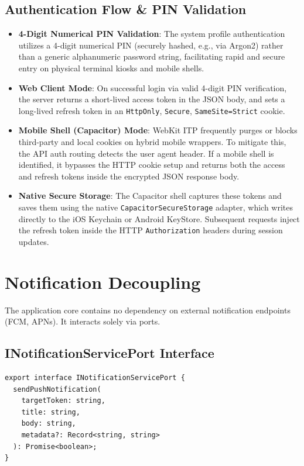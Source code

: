 \documentclass[11pt,a4paper]{report}
\begin{document}
\subsection{Authentication Flow \& PIN Validation}
\begin{itemize}
    \item \textbf{4-Digit Numerical PIN Validation}: The system profile authentication utilizes a 4-digit numerical PIN (securely hashed, e.g., via Argon2) rather than a generic alphanumeric password string, facilitating rapid and secure entry on physical terminal kiosks and mobile shells.
    \item \textbf{Web Client Mode}: On successful login via valid 4-digit PIN verification, the server returns a short-lived access token in the JSON body, and sets a long-lived refresh token in an \texttt{HttpOnly}, \texttt{Secure}, \texttt{SameSite=Strict} cookie.
    \item \textbf{Mobile Shell (Capacitor) Mode}: WebKit ITP frequently purges or blocks third-party and local cookies on hybrid mobile wrappers. To mitigate this, the API auth routing detects the user agent header. If a mobile shell is identified, it bypasses the HTTP cookie setup and returns both the access and refresh tokens inside the encrypted JSON response body.
    \item \textbf{Native Secure Storage}: The Capacitor shell captures these tokens and saves them using the native \texttt{CapacitorSecureStorage} adapter, which writes directly to the iOS Keychain or Android KeyStore. Subsequent requests inject the refresh token inside the HTTP \texttt{Authorization} headers during session updates.
\end{itemize}

\section{Notification Decoupling}
The application core contains no dependency on external notification endpoints (FCM, APNs). It interacts solely via ports.

\subsection{INotificationServicePort Interface}
\begin{lstlisting}[caption={Push Notification Port}]
export interface INotificationServicePort {
  sendPushNotification(
    targetToken: string,
    title: string,
    body: string,
    metadata?: Record<string, string>
  ): Promise<boolean>;
}
\end{lstlisting}
\end{document}

